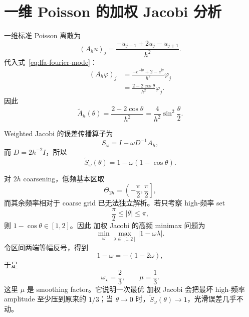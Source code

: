 \section{一维 Poisson 的加权 Jacobi 分析}

一维标准 Poisson 离散为
\begin{equation}
(A_hu)_j
=\frac{-u_{j-1}+2u_j-u_{j+1}}{h^2}.
\label{eq:lfa-poisson-1d}
\end{equation}
代入式~\eqref{eq:lfa-fourier-mode}：
\begin{align}
(A_h\varphi)_j
&=\frac{-e^{-\mathrm i\theta}+2-e^{\mathrm i\theta}}{h^2}\varphi_j\\
&=\frac{2-2\cos\theta}{h^2}\varphi_j.
\end{align}
因此
\begin{equation}
\widetilde A_h(\theta)
=\frac{2-2\cos\theta}{h^2}
=\frac4{h^2}\sin^2\frac\theta2.
\label{eq:lfa-poisson-1d-symbol}
\end{equation}

Weighted Jacobi 的误差传播算子为
\begin{equation}
S_\omega=I-\omega D^{-1}A_h,
\end{equation}
而 $D=2h^{-2}I$，所以
\begin{equation}
\widetilde S_\omega(\theta)
=1-\omega(1-\cos\theta).
\label{eq:lfa-wj-one-dimensional-symbol}
\end{equation}

对 $2h$ coarsening，低频基本区取
\begin{equation}
\Theta_{2h}=\left(-\frac\pi2,\frac\pi2\right],
\label{eq:lfa-1d-low-frequency-domain}
\end{equation}
而其余频率相对于 coarse grid 已无法独立解析。若只考察 high-频率 set
\begin{equation}
\frac\pi2\le|\theta|\le\pi,
\end{equation}
则 $1-\cos\theta\in[1,2]$。因此 加权 Jacobi 的高频 minimax 问题为
\begin{equation}
\min_\omega\max_{\lambda\in[1,2]}|1-\omega\lambda|.
\end{equation}
令区间两端等幅反号，得到
\begin{equation}
1-\omega=-(1-2\omega),
\end{equation}
于是
\begin{equation}
\boxed{\omega_\star=\frac23},
\qquad
\boxed{\mu=\frac13}.
\label{eq:lfa-1d-jacobi-optimal}
\end{equation}
这里 $\mu$ 是 smoothing factor。它说明一次最优 加权 Jacobi 会把最坏 high-频率 amplitude 至少压到原来的 $1/3$；当 $\theta\to0$ 时，$\widetilde S_\omega(\theta)\to1$，光滑误差几乎不动。

